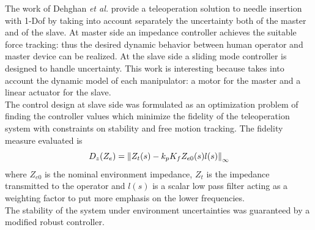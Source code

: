 The work of Dehghan \textit{et al.} \cite{Dehghan2011} provide a teleoperation solution to needle insertion with 1-Dof by taking into account separately the uncertainty both of the master and of the slave. At master side an impedance controller achieves the suitable force tracking: thus the desired dynamic behavior between human operator and master device can be realized.
At the slave side a sliding mode controller is designed to handle uncertainty.
This work is interesting because takes into account the dynamic model of each manipulator: a motor for the master and a linear actuator for the slave.\\
The control design at slave side was formulated as an optimization problem of finding the controller values which minimize the fidelity of the teleoperation system with constraints on stability and free motion tracking.
The fidelity measure evaluated is
\begin{equation*}
	D_{z}(Z_{e}) = \left\lVert Z_{t}(s) - k_{p}K_{f}Z_{e0}(s)l(s)\right\rVert_{\infty}
\end{equation*} 
where $Z_{e0}$ is the nominal environment impedance, $Z_{t}$ is the impedance transmitted to the operator and $l(s)$ is a scalar low pass filter acting as a weighting factor to put more emphasis on the lower frequencies.\\
The stability of the system under environment uncertainties was guaranteed by a modified robust controller.
